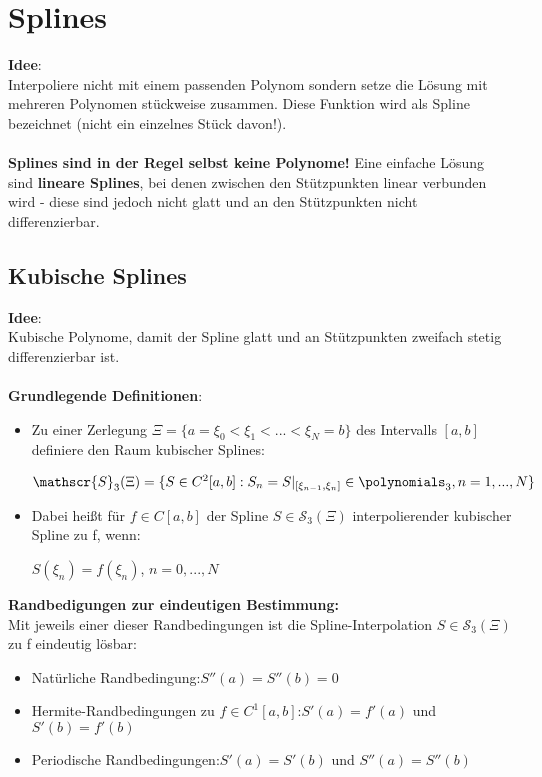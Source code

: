 \section{Splines}%
\label{spl:sec:splines}
\textbf{Idee}:\\Interpoliere nicht mit einem passenden Polynom sondern setze die Lösung mit mehreren Polynomen stückweise zusammen. Diese Funktion wird als Spline bezeichnet (nicht ein einzelnes Stück davon!).\\\\\textbf{Splines sind in der Regel selbst keine Polynome!} Eine einfache Lösung sind \textbf{lineare Splines}, bei denen zwischen den Stützpunkten linear verbunden wird - diese sind jedoch nicht glatt und an den Stützpunkten nicht differenzierbar.

\subsection{Kubische Splines}%
\label{spl:sub:kubische-splines}
\textbf{Idee}:\\Kubische Polynome, damit der Spline glatt und an Stützpunkten zweifach stetig differenzierbar ist.\\\\
\textbf{Grundlegende Definitionen}:
\begin{itemize}
	\item Zu einer Zerlegung $\Xi = \{a = \xi_0 < \xi_1 < ... < \xi_N = b\}$ des Intervalls $[a, b]$ definiere den Raum kubischer Splines:
	\begin{center}
		$\mathscr{S}_3(\Xi) = \{S \in C^2[a, b]: S_n = S|_{[\xi_{n-1}, \xi_n]} \in \polynomials_3, n = 1, ..., N\}$
	\end{center}
	\item Dabei heißt für $f \in C[a, b]$ der Spline $S \in \mathscr{S}_3(\Xi)$ interpolierender kubischer Spline zu f, wenn:
	\begin{center}
		$S(\xi_n) = f(\xi_n)$, $n = 0, ..., N$
	\end{center}
\end{itemize}
\textbf{Randbedigungen zur eindeutigen Bestimmung:}\\
Mit jeweils einer dieser Randbedingungen ist die Spline-Interpolation $S \in \mathscr{S}_3(\Xi)$ zu f eindeutig lösbar:
\begin{itemize}
	\item Natürliche Randbedingung:\hfill$S''(a) = S''(b) = 0$
	\item Hermite-Randbedingungen zu $f \in C^1[a, b]$:\hfill$S'(a) = f'(a)$ und $S'(b) = f'(b)$
	\item Periodische Randbedingungen:\hfill$S'(a) = S'(b)$ und $S''(a) = S''(b)$
\end{itemize}
